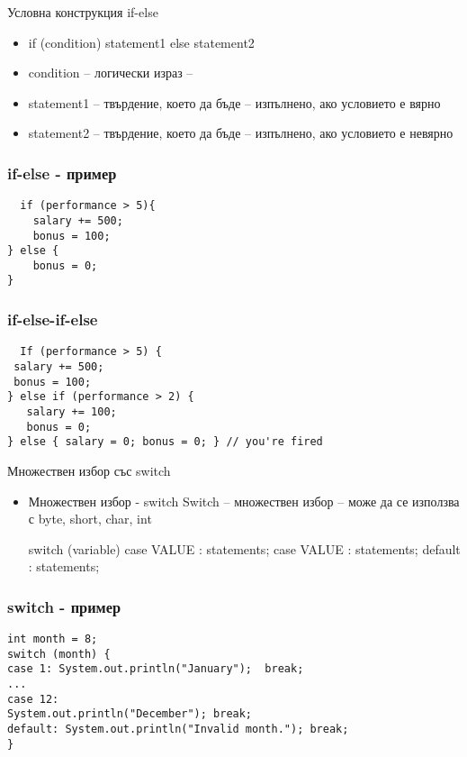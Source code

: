 \documentclass{beamer}
\begin{document}
\begin{frame}{Условна конструкция if-else}
  \transdissolve
  \begin{itemize}
  \item   if (condition) statement1 else statement2
    \item condition – логически израз
    –
    \item statement1 – твърдение, което да бъде
    –
    изпълнено, ако условието е вярно
    \item statement2 – твърдение, което да бъде
    –
    изпълнено, ако условието е невярно

  \end{itemize}
\end{frame}

\begin{frame}[fragile]
  \frametitle{if-else - пример}
  \transdissolve
\begin{lstlisting}
  if (performance > 5){
    salary += 500;
    bonus = 100;
} else {
    bonus = 0;
}
\end{lstlisting}
\end{frame}

\begin{frame}[fragile]
  \frametitle{if-else-if-else}
  \transdissolve
\begin{lstlisting}
  If (performance > 5) {
 salary += 500;
 bonus = 100;
} else if (performance > 2) {
   salary += 100;
   bonus = 0;
} else { salary = 0; bonus = 0; } // you're fired

\end{lstlisting}
\end{frame}

\begin{frame}{Множествен избор със switch}
  \transdissolve
  \begin{itemize}
  \item    Множествен избор - switch
    Switch – множествен избор – може да се
    използва с byte, short, char, int

    switch (variable) {
      case VALUE : statements;
      case VALUE : statements;
      default : statements;
    }

  \end{itemize}
\end{frame}

\begin{frame}[fragile]
  \transdissolve
  \frametitle{switch - пример}
\begin{lstlisting}
int month = 8;
switch (month) {
case 1: System.out.println("January");  break;
...
case 12:
System.out.println("December"); break;
default: System.out.println("Invalid month."); break;
}

\end{lstlisting}
\end{frame}
\end{document}
